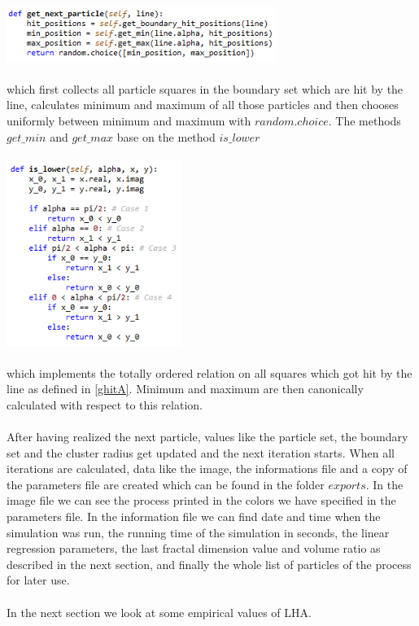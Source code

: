 \documentclass[12pt,a4paper]{scrartcl}
\newcommand{\1}{\mathbbm{1}}
\theoremstyle{definition}
\numberwithin{equation}{section}
\begin{document}
\\
\includegraphics[height=1.8cm]{images/code-snippets/nextparticle.png} \\
\\
which first collects all particle squares in the boundary set which are hit by the line, calculates minimum and maximum of all those particles and then chooses uniformly between minimum and maximum with $\mathit{random.choice}$. The methods $\mathit{get\_min}$ and $\mathit{get\_max}$ base on the method $\mathit{is\_lower}$\\
\\
\includegraphics[height=6cm]{images/code-snippets/islower.png} \\
\\
which implements the totally ordered relation on all squares which got hit by the line as defined in \ref{ghitA}. Minimum and maximum are then canonically calculated with respect to this relation. \\
\\After having realized the next particle, values like the particle set, the boundary set and the cluster radius get updated and the next iteration starts. When all iterations are calculated, data like the image, the informations file and a copy of the parameters file are created which can be found in the folder $\mathit{exports}$. In the image file we can see the process printed in the colors we have specified in the parameters file. In the information file we can find date and time when the simulation was run, the running time of the simulation in seconds, the linear regression parameters, the last fractal dimension value and volume ratio as described in the next section, and finally the whole list of particles of the process for later use. \\
\\In the next section we look at some empirical values of LHA. 
\end{document}
